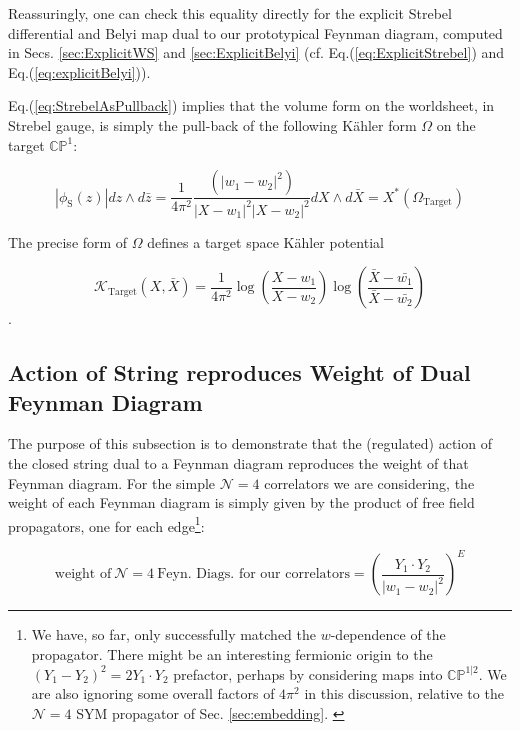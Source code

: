 \documentclass[english]{article}
\renewcommand{\>}{\rangle}
\newcommand{\<}{\langle}
\renewcommand{\(}{\left(}
\renewcommand{\)}{\right)}
\begin{document}
Reassuringly, one can check this equality directly for the explicit Strebel differential and Belyi map dual to our prototypical Feynman diagram, computed in Secs. \ref{sec:ExplicitWS} and \ref{sec:ExplicitBelyi} (cf. Eq.(\ref{eq:ExplicitStrebel}) and Eq.(\ref{eq:explicitBelyi})).  

Eq.(\ref{eq:StrebelAsPullback}) implies that the volume form on the worldsheet, in Strebel gauge, is simply the pull-back of the following Kähler form $\Omega$ on the target $\mathbb{CP}^{1}$:

\begin{equation} \label{eq:Kahlerformtarget}
    |\phi_{\text{S}}(z)| dz \wedge d\bar{z} = \frac{1}{4\pi^2}\frac{(|w_1-w_2|^2)}{|X-w_1|^2 |X-w_2|^2 } dX \wedge d\bar{X} = X^{*} \left( \Omega_{\text{Target}}
 \right) \end{equation}

The precise form of $\Omega$ defines a target space Kähler potential 

\begin{equation}
    \mathcal{K}_{\text{Target}}(X,\bar{X}) = \frac{1}{4\pi^2 } \log\left( \frac{X-w_1}{X-w_2}\right) \log\left( \frac{\bar{X}-\bar{w_1}}{\bar{X}-\bar{w_2}}\right)
\end{equation}.


\subsection{Action of String reproduces Weight of Dual Feynman Diagram} \label{sec:weight=action}

The purpose of this subsection is to demonstrate that the (regulated) action of the closed string dual to a Feynman diagram reproduces the weight of that Feynman diagram. For the simple $\mathcal{N}=4$ correlators we are considering, the weight of each Feynman diagram is simply given by the product of free field propagators, one for each edge\footnote{We have, so far, only successfully matched the $w$-dependence of the propagator. There might be an interesting fermionic origin to the $(Y_1-Y_{2})^2 = 2 Y_{1} \cdot Y_{2}$ prefactor, perhaps by considering maps into $\mathbb{CP}^{1|2}$. We are also ignoring some overall factors of $4 \pi^2$ in this discussion, relative to the $\mathcal{N}=4$ SYM propagator of Sec. \ref{sec:embedding}. \label{fn:y1y2}}:

\begin{equation}
    \text{weight of} \ \mathcal{N}=4 \ \text{Feyn. Diags. for our correlators} = \left( \frac{Y_1 \cdot Y_{2}}{|w_1-w_2|^2} \right) ^{E}
    \end{equation}    
  
\end{document}
